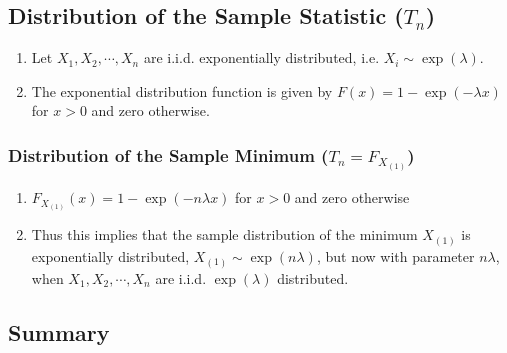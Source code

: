\subsection{Distribution of the Sample Statistic ($T_n$)}

\begin{enumerate}
    \item Let $X_1 , X_2, \cdots , X _n$ are i.i.d. exponentially distributed, i.e. $X _i \sim \exp(\lambda )$.
    \hfill \cite{statistics/book/Statistics-for-Data-Scientists/Maurits-Kaptein}

    \item The exponential distribution function is given by $F (x) = 1 - \exp (-\lambda x)$ for $x > 0$ and zero otherwise.
    \hfill \cite{statistics/book/Statistics-for-Data-Scientists/Maurits-Kaptein}
\end{enumerate}

\subsubsection{Distribution of the Sample Minimum ($T_n = F _{X_{(1)}}$)}

\begin{enumerate}
    \item $F _{X_{(1)}} (x) = 1 - \exp (-n\lambda x)$ for $x > 0$ and zero otherwise
    \hfill \cite{statistics/book/Statistics-for-Data-Scientists/Maurits-Kaptein}

    \item Thus this implies that the sample distribution of the minimum $X_{(1)}$ is exponentially distributed, $X_{(1)} \sim \exp (n\lambda)$, but now with parameter $n\lambda$, when $X_1 ,X_2, \cdots , X _n$ are i.i.d. $\exp(\lambda)$ distributed.
    \hfill \cite{statistics/book/Statistics-for-Data-Scientists/Maurits-Kaptein}
\end{enumerate}



\subsection{Summary}

